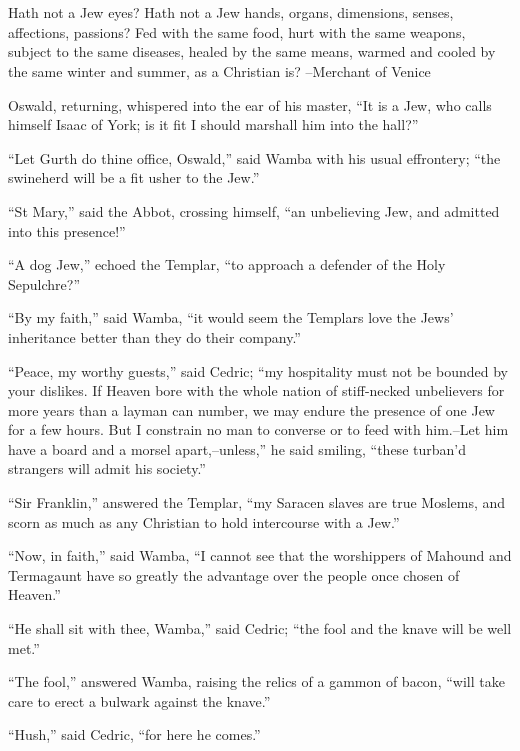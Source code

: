 \chapter{}

Hath not a Jew eyes? Hath not a Jew hands, organs, dimensions, senses,
affections, passions? Fed with the same food, hurt with the same
weapons, subject to the same diseases, healed by the same means, warmed
and cooled by the same winter and summer, as a Christian is? --Merchant
of Venice

Oswald, returning, whispered into the ear of his master, ``It is a Jew,
who calls himself Isaac of York; is it fit I should marshall him into
the hall?''

``Let Gurth do thine office, Oswald,'' said Wamba with his usual
effrontery; ``the swineherd will be a fit usher to the Jew.''

``St Mary,'' said the Abbot, crossing himself, ``an unbelieving Jew, and
admitted into this presence!''

``A dog Jew,'' echoed the Templar, ``to approach a defender of the Holy
Sepulchre?''

``By my faith,'' said Wamba, ``it would seem the Templars love the Jews'
inheritance better than they do their company.''

``Peace, my worthy guests,'' said Cedric; ``my hospitality must not be
bounded by your dislikes. If Heaven bore with the whole nation of
stiff-necked unbelievers for more years than a layman can number, we may
endure the presence of one Jew for a few hours. But I constrain no man
to converse or to feed with him.--Let him have a board and a morsel
apart,--unless,'' he said smiling, ``these turban'd strangers will admit
his society.''

``Sir Franklin,'' answered the Templar, ``my Saracen slaves are true
Moslems, and scorn as much as any Christian to hold intercourse with a
Jew.''

``Now, in faith,'' said Wamba, ``I cannot see that the worshippers of
Mahound and Termagaunt have so greatly the advantage over the people
once chosen of Heaven.''

``He shall sit with thee, Wamba,'' said Cedric; ``the fool and the knave
will be well met.''

``The fool,'' answered Wamba, raising the relics of a gammon of bacon,
``will take care to erect a bulwark against the knave.''

``Hush,'' said Cedric, ``for here he comes.''

